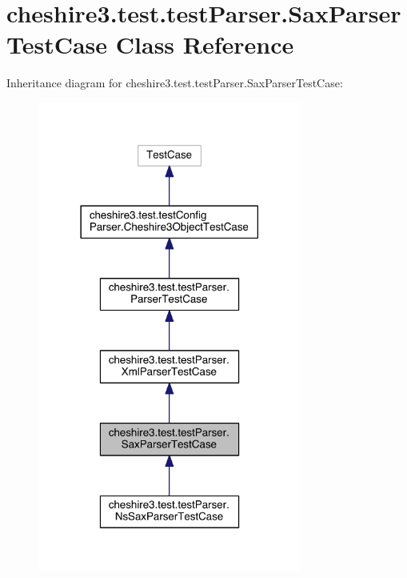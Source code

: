\hypertarget{classcheshire3_1_1test_1_1test_parser_1_1_sax_parser_test_case}{\section{cheshire3.\-test.\-test\-Parser.\-Sax\-Parser\-Test\-Case Class Reference}
\label{classcheshire3_1_1test_1_1test_parser_1_1_sax_parser_test_case}
}


Inheritance diagram for cheshire3.\-test.\-test\-Parser.\-Sax\-Parser\-Test\-Case\-:
\nopagebreak
\begin{figure}[H]
\begin{center}
\leavevmode
\includegraphics[width=246pt]{classcheshire3_1_1test_1_1test_parser_1_1_sax_parser_test_case__inherit__graph}
\end{center}
\end{figure}


